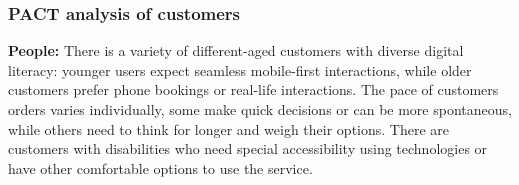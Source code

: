 \documentclass[]{VUMIFTemplateClass}
\newcommand{\todocomment}[1]{%
    \begin{tcolorbox}[colback=red!20, colframe=red!60, arc=0pt, outer arc=0pt, boxrule=1pt, left=3pt, right=3pt, top=3pt, bottom=3pt]
        \textbf{\textcolor{orange!70!black}{TODO:}} #1
    \end{tcolorbox}
}
\newcommand{\subsubsubsection}[1]{\paragraph{#1}}
\begin{document}



\subsubsection{PACT analysis of customers}

\textbf{People:} There is a variety of different-aged customers with diverse digital literacy: younger users expect seamless mobile-first interactions, while older customers prefer phone bookings or real-life interactions. The pace of customers orders varies individually, some make quick decisions or can be more spontaneous, while others need to think for longer and weigh their options. There are customers with disabilities who need special accessibility using technologies or have other comfortable options to use the service.
\end{document}

